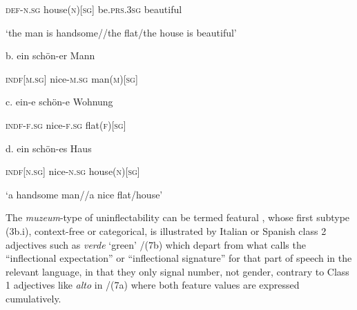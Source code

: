 \documentclass[output=paper]{langscibook}
\begin{document}
\begin{styleTabellaLUNGA}
    \textsc{def-n.sg}  house(\textsc{n)[sg]}  be.\textsc{prs.}3\textsc{sg}  beautiful
\end{styleTabellaLUNGA}

\begin{styleTabellaLUNGA}
    ‘the man is handsome//the flat/the house is beautiful’
\end{styleTabellaLUNGA}

\begin{styleTabellaLUNGA}
  b.  ein    schön-er  Mann  
\end{styleTabellaLUNGA}

\begin{styleTabellaLUNGA}
    \textsc{indf[m.sg]}  nice-\textsc{m.sg}  man(\textsc{m)[sg]}
\end{styleTabellaLUNGA}

\begin{styleTabellaLUNGA}
  c.  ein-e    schön-e    Wohnung          
\end{styleTabellaLUNGA}

\begin{styleTabellaLUNGA}
    \textsc{indf}{}-\textsc{f.sg}  nice-\textsc{f.sg}  flat(\textsc{f})[\textsc{sg}]      
\end{styleTabellaLUNGA}

\begin{styleTabellaLUNGA}
  d.  ein    schön-es  Haus
\end{styleTabellaLUNGA}

\begin{styleTabellaLUNGA}
    \textsc{indf}[\textsc{n.sg}]  nice-\textsc{n.sg}  house(\textsc{n})[\textsc{sg}]  
\end{styleTabellaLUNGA}

\begin{styleTabellaLUNGA}
    ‘a handsome man//a nice flat/house’
\end{styleTabellaLUNGA}

The \textit{muzeum}{}-type of uninflectability can be termed featural , whose first subtype (3b.i), context-free or categorical, is illustrated by Italian or Spanish class 2 adjectives such as \textit{verde} ‘green’ /(7b) which depart from what \citet[146]{Spencer2020} calls the “inflectional expectation” or “inflectional signature” for that part of speech in the relevant language, in that they only signal number, not gender, contrary to Class 1 adjectives like \textit{alto} in /(7a) where both feature values are expressed cumulatively.
\end{document}
